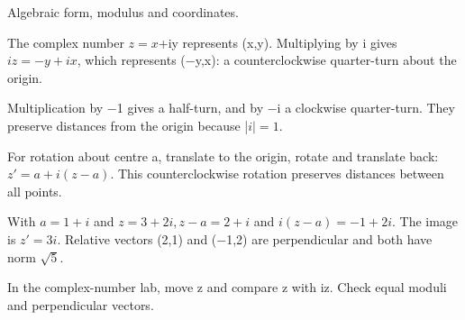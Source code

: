\documentclass[11pt]{article}
\begin{document}
Algebraic form, modulus and coordinates.\par
{}
The complex number \(z=x\)+iy represents (x,y). Multiplying by i gives \(iz=-y+ix\), which represents (−y,x): a counterclockwise quarter-turn about the origin.\par
Multiplication by −1 gives a half-turn, and by −i a clockwise quarter-turn. They preserve distances from the origin because |\(i|=1\).\par
For rotation about centre a, translate to the origin, rotate and translate back: \(z'=a+i(z-a)\). This counterclockwise rotation preserves distances between all points.\par
{}
With \(a=1+i\) and \(z=3+2i, z-a=2+i\) and \(i(z-a)=-1+2i\). The image is \(z'=3i\). Relative vectors (2,1) and (−1,2) are perpendicular and both have norm \(\sqrt{5}\).\par
\begin{center}\end{center}
In the complex-number lab, move z and compare z with iz. Check equal moduli and perpendicular vectors.\par
\end{document}

